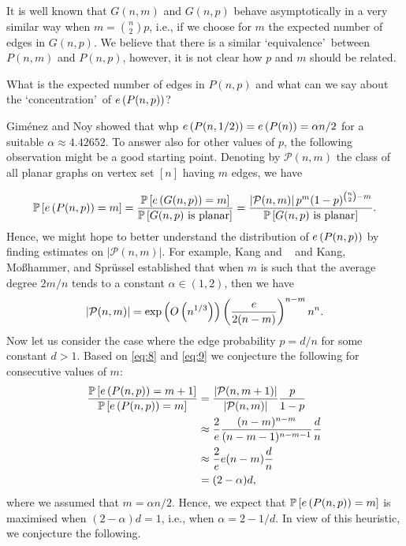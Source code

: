 It is well known that $G(n,m)$ and $G(n,p)$ behave asymptotically in a very similar way when $m=\binom{n}{2}p$, i.e., if we choose for $m$ the expected number of edges in $G(n,p)$. We believe that there is a similar \lq equivalence\rq\ between $P(n,m)$ and $P(n,p)$, however, it is not clear how $p$ and $m$ should be related.

\begin{question}\label{que:pnp}
What is the expected number of edges in $P(n,p)$ and what can we say about the \lq concentration\rq\ of $e\left({P(n,p)}\right)$?
\end{question}

Gim\'{e}nez and Noy \cite{GimenezNoy2009} showed that whp $e\left({P(n,1/2)}\right)=e\left({P(n)}\right)=\alpha n/2$ for a suitable $\alpha\approx 4.42652$. To answer  also for other values of $p$, the following observation might be a good starting point. Denoting by $\mathcal{P}(n,m)$ the class of all planar graphs on vertex set $[n]$ having $m$ edges, we have

\begin{align}\label{eq:8}
    \mathbb{P}\left[e\left({P(n,p)}\right)=m\right]=\frac{\mathbb{P}\left[e\left({G(n,p)}\right)=m\right]}{\mathbb{P}\left[G(n,p) \text{ is planar}\right]}=\frac{\left|\mathcal{P}(n,m)\right|p^m(1-p)^{\binom{n}{2}-m}}{\mathbb{P}\left[G(n,p) \text{ is planar}\right]}.
\end{align}
Hence, we might hope to better understand the distribution of $e\left({P(n,p)}\right)$ by finding estimates on $\left|\mathcal{P}(n,m)\right|$. For example, Kang and \Luczak\ \cite{KangLuczak2012} and Kang, Mo{\ss}hammer, and Spr\"{u}ssel \cite{KangMosshammerSpruessel2020} established that when $m$ is such that the average degree $2m/n$ tends to a constant $\alpha\in(1,2)$, then we have
\begin{align}\label{eq:9}
\left|\mathcal{P}(n,m)\right|=\exp\left(O\left(n^{1/3}\right)\right)\left(\frac{e}{2(n-m)}\right)^{n-m}n^n.
\end{align}
Now let us consider the case where the edge probability $p=d/n$ for some constant $d>1$. Based on \eqref{eq:8} and \eqref{eq:9} we conjecture the following for consecutive values of $m$:
\begin{align*}
    \frac{\mathbb{P}\left[e\left({P(n,p)}\right)=m+1\right]}{\mathbb{P}\left[e\left({P(n,p)}\right)=m\right]}&=\frac{\left|\mathcal{P}(n,m+1)\right|}{\left|\mathcal{P}(n,m)\right|}\frac{p}{1-p}
    \\
    &\approx \frac{2}{e}\frac{(n-m)^{n-m}}{(n-m-1)^{n-m-1}}\frac{d}{n}
    \\
    &\approx \frac{2}{e}e (n-m)\frac{d}{n}
    \\
    &=(2-\alpha) d,
\end{align*}
where we assumed that $m=\alpha n/2$. Hence, we expect that $\mathbb{P}\left[e\left({P(n,p)}\right)=m\right]$ is maximised when $(2-\alpha)d=1$, i.e., when $\alpha=2-1/d$. In view of this heuristic, we conjecture the following.

